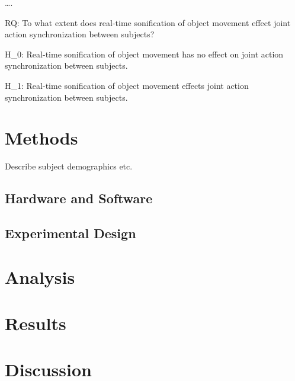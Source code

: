 \documentclass[10pt,a4paper,onecolumn]{article}
\begin{document}
\ldots.

RQ: To what extent does real-time sonification of object movement effect joint action synchronization between subjects?

H\_0: Real-time sonification of object movement has no effect on joint action synchronization between subjects.

H\_1: Real-time sonification of object movement effects joint action synchronization between subjects.

\hypertarget{methods}{%
\section{Methods}\label{methods}}

Describe subject demographics etc.

\hypertarget{hardware-and-software}{%
\subsection{Hardware and Software}\label{hardware-and-software}}

\hypertarget{experimental-design}{%
\subsection{Experimental Design}\label{experimental-design}}

\hypertarget{analysis}{%
\section{Analysis}\label{analysis}}

\hypertarget{results}{%
\section{Results}\label{results}}

\hypertarget{discussion}{%
\section{Discussion}\label{discussion}}

\printbibliography[title=References]
\end{document}
